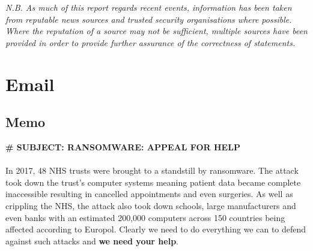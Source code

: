 \documentclass{article}
\begin{document}
\textit{N.B. As much of this report regards recent events, information has been taken from reputable news sources and trusted security organisations where possible.
Where the reputation of a source may not be sufficient, multiple sources have been provided in order to provide further assurance of the correctness of statements.}

\section{Email}
\subsection{Memo}%

\textbf{\# SUBJECT: RANSOMWARE: APPEAL FOR HELP}
\\\\
In 2017, 48 NHS trusts were brought to a standstill by ransomware. The attack took down the trust's computer systems meaning patient data became complete inaccessible resulting in cancelled appointments and even surgeries\cite{wannacry_bbc}. As well as crippling the NHS, the attack also took down schools, large manufacturers and even banks with an estimated 200,000 computers across 150 countries being affected according to Europol\cite{wannacry_reuters}. Clearly we need to do everything we can to defend against such attacks and \textbf{we need your help}.
\end{document}
